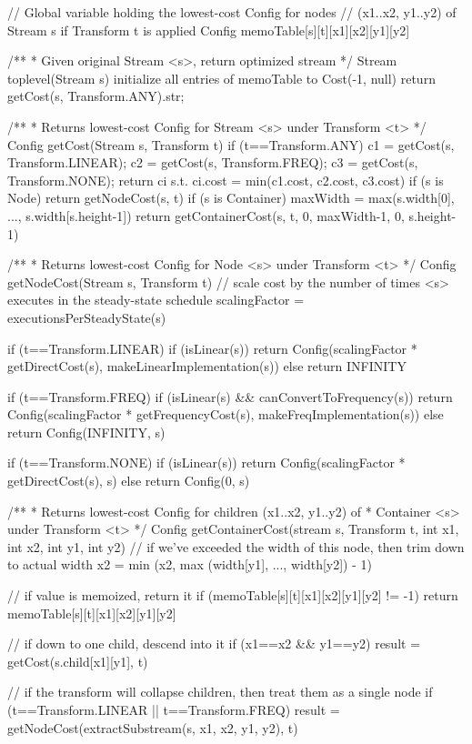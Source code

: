 // Global variable holding the lowest-cost Config for nodes
// (x1..x2, y1..y2) of Stream s if Transform t is applied
Config memoTable[s][t][x1][x2][y1][y2]

/** 
 * Given original Stream <s>, return optimized stream
 */
Stream toplevel(Stream s)
  initialize all entries of memoTable to Cost(-1, null)
  return getCost(s, Transform.ANY).str;

/**
 * Returns lowest-cost Config for Stream <s> under Transform <t>
 */
Config getCost(Stream s, Transform t)
  if (t==Transform.ANY)
    c1 = getCost(s, Transform.LINEAR);
    c2 = getCost(s, Transform.FREQ);
    c3 = getCost(s, Transform.NONE);
    return ci s.t. ci.cost = min(c1.cost, c2.cost, c3.cost)
  if (s is Node)
    return getNodeCost(s, t)
  if (s is Container)
    maxWidth = max(s.width[0], ..., s.width[s.height-1])
    return getContainerCost(s, t, 0, maxWidth-1, 0, s.height-1)

/**
 * Returns lowest-cost Config for Node <s> under Transform <t>
 */ 
Config getNodeCost(Stream s, Transform t)
  // scale cost by the number of times <s> executes in the steady-state schedule
  scalingFactor = executionsPerSteadyState(s)

  if (t==Transform.LINEAR)
    if (isLinear(s))
      return Config(scalingFactor * getDirectCost(s), makeLinearImplementation(s))
    else
      return INFINITY

  if (t==Transform.FREQ)
    if (isLinear(s) && canConvertToFrequency(s))
      return Config(scalingFactor * getFrequencyCost(s), makeFreqImplementation(s))
    else 
      return Config(INFINITY, s)

  if (t==Transform.NONE)
    if (isLinear(s))
      return Config(scalingFactor * getDirectCost(s), s)
    else
      return Config(0, s)

/** 
 * Returns lowest-cost Config for children (x1..x2, y1..y2) of
 * Container <s> under Transform <t>
 */
Config getContainerCost(stream s, Transform t, int x1, int x2, int y1, int y2)
  // if we've exceeded the width of this node, then trim down to actual width
  x2 = min (x2, max (width[y1], ..., width[y2]) - 1)

  // if value is memoized, return it
  if (memoTable[s][t][x1][x2][y1][y2] != -1)
    return memoTable[s][t][x1][x2][y1][y2]

  // if down to one child, descend into it
  if (x1==x2 && y1==y2)
    result = getCost(s.child[x1][y1], t)

  // if the transform will collapse children, then treat them as a single node
  if (t==Transform.LINEAR || t==Transform.FREQ)
    result = getNodeCost(extractSubstream(s, x1, x2, y1, y2), t)

